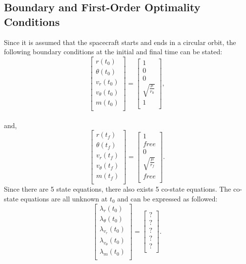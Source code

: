 \documentclass[]{article}
\begin{document}
\subsection{Boundary and First-Order Optimality Conditions}
Since it is assumed that the spacecraft starts and ends in a circular orbit, the following boundary conditions at the initial and final time can be stated:
\[
\begin{bmatrix}
	r(t_0)\\
	\theta(t_0)\\
	v_r(t_0)\\
	v_{\theta}(t_0)\\
	m(t_0)\\
\end{bmatrix}
=
\begin{bmatrix}
	1\\
	0\\
	0\\
	\sqrt{\frac{\mu}{r_0}}\\
	1\\
\end{bmatrix},
\]\\
and,
\[
\begin{bmatrix}
	r(t_f)\\
	\theta(t_f)\\
	v_r(t_f)\\
	v_{\theta}(t_f)\\
	m(t_f)\\
\end{bmatrix}
=
\begin{bmatrix}
	1\\
	free\\
	0\\
	\sqrt{\frac{\mu}{r_f}}\\
	free\\
\end{bmatrix}.
\]
Since there are 5 state equations, there also exists 5 co-state equations. The co-state equations are all unknown at \(t_0\) and can be expressed as followed:
\[
\begin{bmatrix}
	\lambda_{r}(t_0)\\
	\lambda_{\theta}(t_0)\\
	\lambda_{v_r}(t_0)\\
	\lambda_{v_{\theta}}(t_0)\\
	\lambda_{m}(t_0)\\
\end{bmatrix}
=
\begin{bmatrix}
	?\\
	?\\
	?\\
	?\\
	?\\
\end{bmatrix}.
\]
\end{document}
